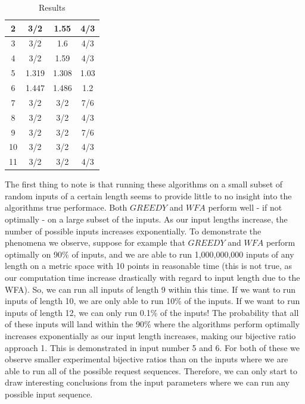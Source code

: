 \begin{table}[!htb]
\begin{minipage}{.5\linewidth}
\begin{tabular}{|c|c|c|c|}
          \hline
          2 & 3/2 & 1.55 & 4/3\\
          \hline
          3 & 3/2 & 1.6 & 4/3 \\
          \hline
          4 & 3/2 & 1.59 & 4/3 \\
          \hline
          5 & 1.319 & 1.308 & 1.03 \\
          \hline
          6 & 1.447 & 1.486 & 1.2 \\
          \hline
          7 & 3/2 & 3/2 & 7/6 \\
          \hline
          8 & 3/2 & 3/2 & 4/3 \\
          \hline
          9 & 3/2 & 3/2 & 7/6 \\
          \hline
          10 & 3/2 & 3/2 & 4/3 \\
          \hline
          11 & 3/2 & 3/2 & 4/3 \\
          \hline

      \end{tabular}
          \caption{Results}
          \label{tab:results}
    \end{minipage} 
\end{table}

The first thing to note is that running these algorithms on a small subset of random inputs of a certain length seems to provide little to no insight into the algorithms true performace. Both $GREEDY$ and $WFA$ perform well - if not optimally - on a large subset of the inputs. As our input lengths increase, the number of possible inputs increases exponentially. To demonstrate the phenomena we observe, suppose for example that $GREEDY$ and $WFA$ perform optimally on 90\% of inputs, and we are able to run 1,000,000,000 inputs of any length on a metric space with 10 points in reasonable time (this is not true, as our computation time increase drastically with regard to input length due to the WFA). So, we can run all inputs of length 9 within this time. If we want to run inputs of length 10, we are only able to run 10\% of the inputs. If we want to run inputs of length 12, we can only run 0.1\% of the inputs! The probability that all of these inputs will land within the 90\% where the algorithms perform optimally increases exponentially as our input length increases, making our bijective ratio approach 1. This is demonstrated in input number 5 and 6. For both of these we observe smaller experimental bijective ratios than on the inputs where we are able to run all of the possible request sequences. Therefore, we can only start to draw interesting conclusions from the input parameters where we can run any possible input sequence.

